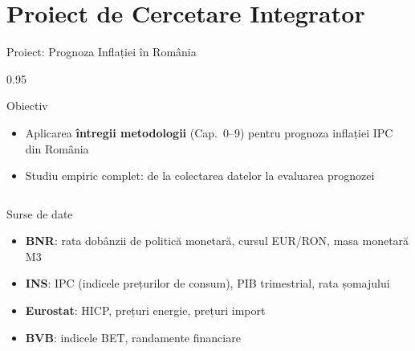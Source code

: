 \documentclass[9pt, aspectratio=169, t]{beamer}
\begin{document}
\section{Proiect de Cercetare Integrator}

\begin{frame}{Proiect: Prognoza Inflației în România}
    \begin{cminipage}{0.95\textwidth}
        \begin{block}{Obiectiv}
            \begin{itemize}\setlength{\itemsep}{0pt}
                \item Aplicarea \textbf{întregii metodologii} (Cap.\ 0--9) pentru prognoza inflației IPC din România
                \item Studiu empiric complet: de la colectarea datelor la evaluarea prognozei
            \end{itemize}
        \end{block}

        \vspace{0.2cm}

        {\footnotesize
        \begin{columns}[T]
            \begin{exampleblock}{Surse de date}
                \begin{itemize}\setlength{\itemsep}{0pt}
                    \item \textbf{BNR}: rata dobânzii de politică monetară, cursul EUR/RON, masa monetară M3
                    \item \textbf{INS}: IPC (indicele prețurilor de consum), PIB trimestrial, rata șomajului
                    \item \textbf{Eurostat}: HICP, prețuri energie, prețuri import
                    \item \textbf{BVB}: indicele BET, randamente financiare
                \end{itemize}
            \end{exampleblock}


\end{columns}}
\end{cminipage}
\end{frame}
\end{document}
